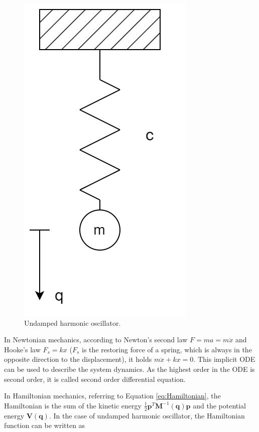 \documentclass[
	parskip, 			   %
	twoside, 			   %
	DIV=14, 			   %
	BCOR=15.0mm, 		   %
	headsepline, 		   %
	open=right, 		   %
	captions=tableheading, %
	bibliography=totoc,    %
	numbers=noenddot       %
]{scrreprt}
\begin{document}
\clearpage
\begin{figure}[h!]
    \centering
    \includegraphics[scale=0.3]{figures/undamped harmonic oscillator.jpg}
    \caption{Undamped harmonic oscillator.}
    \label{fig:physical_model_undamped_harmonic_oscillator}
\end{figure}

In Newtonian mechanics, according to Newton's second law $F=ma=m\ddot{x}$ and Hooke's law $F_s=kx$ ($F_s$ is the restoring force of a spring, which is always in the opposite direction to the displacement), it holds $m\ddot{x}+kx=0$. This implicit ODE can be used to describe the system dynamics. As the highest order in the ODE is second order, it is called second order differential equation.

In Hamiltonian mechanics, referring to Equation \ref{eq:Hamiltonian}, the Hamiltonian is the sum of the kinetic energy $\frac{1}{2}\mathbf{p}^T\mathbf{M}^{-1}(\mathbf{q})\mathbf{p}$ and the potential energy $\mathbf{V}(\mathbf{q})$. In the case of undamped harmonic oscillator, the Hamiltonian function can be written as
\end{document}
